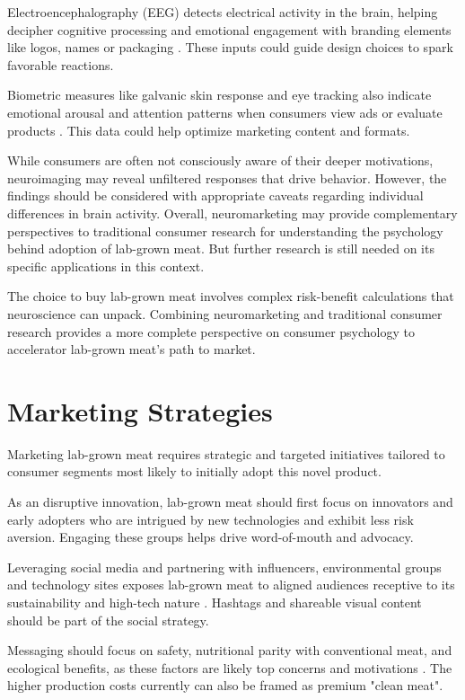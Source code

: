 \documentclass[10pt]{article}
\begin{document}
\begin{sloppypar}
  Electroencephalography (EEG) detects electrical activity in the brain, helping decipher cognitive processing and emotional engagement with branding elements like logos, names or packaging \citep{khushaba_consumer_2013}. These inputs could guide design choices to spark favorable reactions.

  Biometric measures like galvanic skin response and eye tracking also indicate emotional arousal and attention patterns when consumers view ads or evaluate products \citep{riedl_decade_2020}. This data could help optimize marketing content and formats.

  While consumers are often not consciously aware of their deeper motivations, neuroimaging may reveal unfiltered responses that drive behavior. However, the findings should be considered with appropriate caveats regarding individual differences in brain activity. Overall, neuromarketing may provide complementary perspectives to traditional consumer research for understanding the psychology behind adoption of lab-grown meat. But further research is still needed on its specific applications in this context.

  The choice to buy lab-grown meat involves complex risk-benefit calculations that neuroscience can unpack. Combining neuromarketing and traditional consumer research provides a more complete perspective on consumer psychology to accelerator lab-grown meat’s path to market.

  \section{Marketing Strategies}
  \label{sec:marketing-strategies}

  Marketing lab-grown meat requires strategic and targeted initiatives tailored to consumer segments most likely to initially adopt this novel product.

  As an disruptive innovation, lab-grown meat should first focus on innovators and early adopters who are intrigued by new technologies and exhibit less risk aversion. Engaging these groups helps drive word-of-mouth and advocacy.

  Leveraging social media and partnering with influencers, environmental groups and technology sites exposes lab-grown meat to aligned audiences receptive to its sustainability and high-tech nature \citep{goodwin_future_2013}. Hashtags and shareable visual content should be part of the social strategy.

  Messaging should focus on safety, nutritional parity with conventional meat, and ecological benefits, as these factors are likely top concerns and motivations \citep{circus_exploring_2018}. The higher production costs currently can also be framed as premium "clean meat".


\end{sloppypar}
\end{document}
